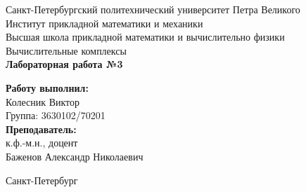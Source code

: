 \begin{titlepage}	%

	\begin{center}		%

		\large Санкт-Петербургский политехнический университет Петра Великого\\
		\large Институт прикладной математики и механики \\
		\large Высшая школа прикладной математики и вычислительно физики \\[6cm]
		
		\huge Вычислительные комплексы\\[0.5cm] %
		\large \textbf{Лабораторная работа №3}\\[5.1cm]

	\end{center}


	\begin{flushright} %
		\begin{minipage}{0.25\textwidth} %
			\begin{flushleft} %

				\large\textbf{Работу выполнил:}\\
				\large Колесник Виктор\\
				\large {Группа:} 3630102/70201\\
				
				\large \textbf{Преподаватель:}\\
				\large к.ф.-м.н., доцент\\
				\large Баженов Александр Николаевич

			\end{flushleft}
		\end{minipage}
	\end{flushright}
	
	\vfill %

	\begin{center}
	\large Санкт-Петербург\\
	\large \the\year %
	\end{center} %

\end{titlepage} %

\vfill %
